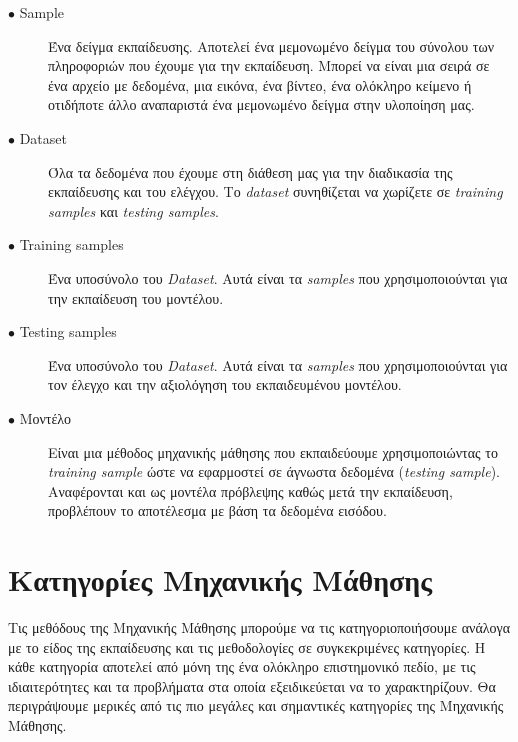 \begin{description}

\item[$\bullet$ Sample] Ένα δείγμα εκπαίδευσης. Αποτελεί ένα μεμονωμένο δείγμα του σύνολου των πληροφοριών που έχουμε για την εκπαίδευση. Μπορεί να είναι μια σειρά σε ένα αρχείο με δεδομένα, μια εικόνα, ένα βίντεο, ένα ολόκληρο κείμενο ή οτιδήποτε άλλο αναπαριστά ένα μεμονωμένο δείγμα στην υλοποίηση μας.

\item[$\bullet$ Dataset] Όλα τα δεδομένα που έχουμε στη διάθεση μας για την διαδικασία της εκπαίδευσης και του ελέγχου. Το \textit{dataset} συνηθίζεται να χωρίζετε σε \textit{training samples} και \textit{testing samples}. 

\item[$\bullet$ Training samples] Ένα υποσύνολο του \textit{Dataset}. Αυτά είναι τα \textit{samples} που χρησιμοποιούνται για την εκπαίδευση του μοντέλου. 

\item[$\bullet$ Testing samples] Ένα υποσύνολο του \textit{Dataset}. Αυτά είναι τα \textit{samples} που χρησιμοποιούνται για τον έλεγχο και την αξιολόγηση του εκπαιδευμένου μοντέλου. 

\item[$\bullet$ Μοντέλο] Είναι μια μέθοδος μηχανικής μάθησης που εκπαιδεύουμε χρησιμοποιώντας το \textit{training sample} ώστε να εφαρμοστεί σε άγνωστα δεδομένα (\textit{testing sample}). Αναφέρονται και ως μοντέλα πρόβλεψης καθώς μετά την εκπαίδευση, προβλέπουν το αποτέλεσμα με βάση τα δεδομένα εισόδου. 

\end{description}

\section{Κατηγορίες Μηχανικής Μάθησης}
Τις μεθόδους της Μηχανικής Μάθησης μπορούμε να τις κατηγοριοποιήσουμε ανάλογα με το είδος της εκπαίδευσης και τις μεθοδολογίες σε συγκεκριμένες κατηγορίες. Η κάθε κατηγορία αποτελεί από μόνη της ένα ολόκληρο επιστημονικό πεδίο, με τις ιδιαιτερότητες και τα προβλήματα στα οποία εξειδικεύεται να το χαρακτηρίζουν. Θα περιγράψουμε μερικές από τις πιο μεγάλες και σημαντικές κατηγορίες της Μηχανικής Μάθησης.

